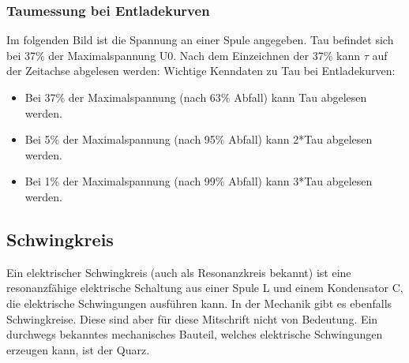 \subsubsection{Taumessung bei Entladekurven}
Im folgenden Bild ist die Spannung an einer Spule angegeben. Tau befindet sich bei 37$\%$ der Maximalspannung U0. Nach dem Einzeichnen der 37$\%$ kann $\tau$ auf der Zeitachse abgelesen werden:
Wichtige Kenndaten zu Tau bei Entladekurven:
\begin{itemize}
    \item Bei 37$\%$ der Maximalspannung (nach 63$\%$ Abfall) kann Tau abgelesen werden.
    \item Bei 5$\%$ der Maximalspannung (nach 95$\%$ Abfall) kann 2*Tau abgelesen werden.
    \item Bei 1$\%$ der Maximalspannung (nach 99$\%$ Abfall) kann 3*Tau abgelesen werden.
\end{itemize}
\subsection{Schwingkreis}
Ein elektrischer Schwingkreis (auch als Resonanzkreis bekannt) ist eine resonanzfähige elektrische Schaltung aus einer Spule L und einem Kondensator C, die elektrische Schwingungen ausführen kann. In der Mechanik gibt es ebenfalls Schwingkreise. Diese sind aber für diese Mitschrift nicht von Bedeutung. Ein durchwegs bekanntes mechanisches Bauteil, welches elektrische Schwingungen erzeugen kann, ist der Quarz.

